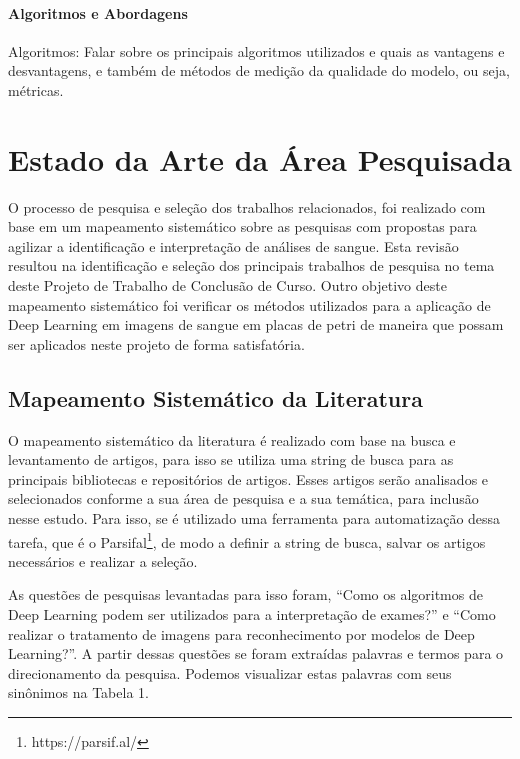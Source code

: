 \subsubsection{Algoritmos e Abordagens}
Algoritmos: Falar sobre os principais algoritmos utilizados e quais as vantagens e desvantagens, e também de métodos de medição da qualidade do modelo, ou seja, métricas.


\chapter{Estado da Arte da Área Pesquisada}
\label{chap:mapeamento}

O processo de pesquisa e seleção dos trabalhos relacionados, foi realizado com base em um mapeamento sistemático sobre as pesquisas com propostas para agilizar a identificação e interpretação de análises de sangue. Esta revisão resultou na identificação e seleção dos principais trabalhos de pesquisa no tema deste Projeto de Trabalho de Conclusão de Curso. Outro objetivo deste mapeamento sistemático foi verificar os métodos utilizados para a aplicação de Deep Learning em imagens de sangue em placas de petri de maneira que possam ser aplicados neste projeto de forma satisfatória.

\section{Mapeamento Sistemático da Literatura}

O mapeamento sistemático da literatura é realizado com base na busca e levantamento de artigos, para isso se utiliza uma string de busca para as principais bibliotecas e repositórios de artigos. Esses artigos serão analisados e selecionados conforme a sua área de pesquisa e a sua temática, para inclusão nesse estudo. Para isso, se é utilizado uma ferramenta para automatização dessa tarefa, que é o Parsifal\footnote[1]{https://parsif.al/}, de modo a definir a string de busca, salvar os artigos necessários e realizar a seleção.

As questões de pesquisas levantadas para isso foram, ``Como os algoritmos de Deep Learning podem ser utilizados para a interpretação de exames?'' e ``Como realizar o tratamento de imagens para reconhecimento por modelos de Deep Learning?''. A partir dessas questões se foram extraídas palavras e termos para o direcionamento da pesquisa. Podemos visualizar estas palavras com seus sinônimos na Tabela 1.

